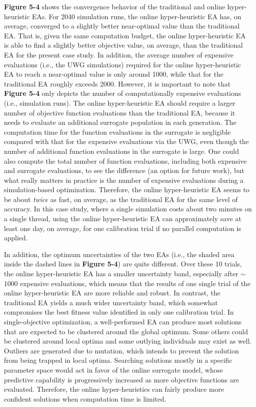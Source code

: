 \textbf{Figure 5-4} shows the convergence behavior of the traditional and online hyper-heuristic EAs. For 2040 simulation runs, the online hyper-heuristic EA has, on average, converged to a slightly better near-optimal value than the traditional EA. That is, given the same computation budget, the online hyper-heuristic EA is able to find a slightly better objective value, on average, than the traditional EA for the present case study. In addition, the average number of expensive evaluations (i.e., the UWG simulations) required for the online hyper-heuristic EA to reach a near-optimal value is only around 1000, while that for the traditional EA roughly exceeds 2000. However, it is important to note that \textbf{Figure 5-4} only depicts the number of computationally expensive evaluations (i.e., simulation runs). The online hyper-heuristic EA should require a larger number of objective function evaluations than the traditional EA, because it needs to evaluate an additional surrogate population in each generation. The computation time for the function evaluations in the surrogate is negligible compared with that for the expensive evaluations via the UWG, even though the number of additional function evaluations in the surrogate is large. One could also compute the total number of function evaluations, including both expensive and surrogate evaluations, to see the difference (an option for future work), but what really matters in practice is the number of expensive evaluations during a simulation-based optimization. Therefore, the online hyper-heuristic EA seems to be about \textit{twice} as fast, on average, as the traditional EA for the same level of accuracy. In this case study, where a single simulation costs about two minutes on a single thread, using the online hyper-heuristic EA can approximately save at least one day, on average, for one calibration trial if no parallel computation is applied.

In addition, the optimum uncertainties of the two EAs (i.e., the shaded area inside the dashed lines in \textbf{Figure 5-4}) are quite different. Over these 10 trials, the online hyper-heuristic EA has a smaller uncertainty band, especially after $\sim$1000 expensive evaluations, which means that the results of one single trial of the online hyper-heuristic EA are more reliable and robust. In contrast, the traditional EA yields a much wider uncertainty band, which somewhat compromises the best fitness value identified in only one calibration trial. In single-objective optimization, a well-performed EA can produce most solutions that are expected to be clustered around the global optimum. Some others could be clustered around local optima and some outlying individuals may exist as well. Outliers are generated due to mutation, which intends to prevent the solution from being trapped in local optima. Searching solutions mostly in a specific parameter space would act in favor of the online surrogate model, whose predictive capability is progressively increased as more objective functions are evaluated. Therefore, the online hyper-heuristics can fairly produce more confident solutions when computation time is limited.

